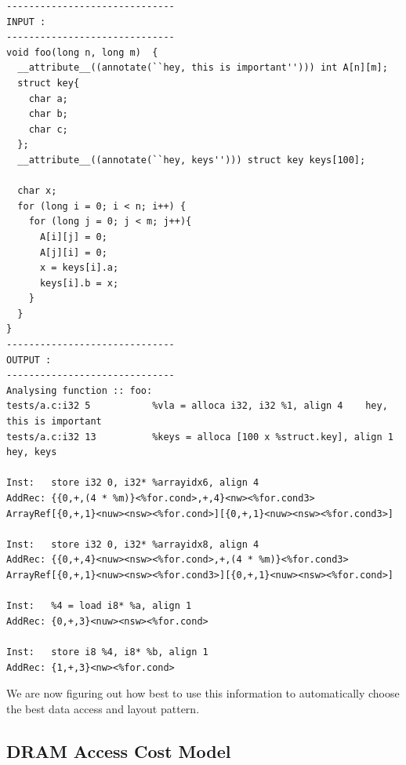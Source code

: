\documentclass[letterpaper]{article}
\begin{document}
\begin{Verbatim}[fontsize=\small]
------------------------------
INPUT :
------------------------------
void foo(long n, long m)  {
  __attribute__((annotate(``hey, this is important''))) int A[n][m];
  struct key{
    char a;
    char b;
    char c;
  };
  __attribute__((annotate(``hey, keys''))) struct key keys[100];

  char x;
  for (long i = 0; i < n; i++) {
    for (long j = 0; j < m; j++){
      A[i][j] = 0;
      A[j][i] = 0;
      x = keys[i].a;
      keys[i].b = x;
    }
  }
}
------------------------------
OUTPUT :
------------------------------
Analysing function :: foo:
tests/a.c:i32 5           %vla = alloca i32, i32 %1, align 4    hey, this is important
tests/a.c:i32 13          %keys = alloca [100 x %struct.key], align 1   hey, keys

Inst:   store i32 0, i32* %arrayidx6, align 4
AddRec: {{0,+,(4 * %m)}<%for.cond>,+,4}<nw><%for.cond3>
ArrayRef[{0,+,1}<nuw><nsw><%for.cond>][{0,+,1}<nuw><nsw><%for.cond3>]

Inst:   store i32 0, i32* %arrayidx8, align 4
AddRec: {{0,+,4}<nuw><nsw><%for.cond>,+,(4 * %m)}<%for.cond3>
ArrayRef[{0,+,1}<nuw><nsw><%for.cond3>][{0,+,1}<nuw><nsw><%for.cond>]

Inst:   %4 = load i8* %a, align 1
AddRec: {0,+,3}<nuw><nsw><%for.cond>

Inst:   store i8 %4, i8* %b, align 1
AddRec: {1,+,3}<nw><%for.cond>
\end{Verbatim}

We are now figuring out how best to use this information to automatically
choose the best data access and layout pattern.

\subsection{DRAM Access Cost Model}
\end{document}
